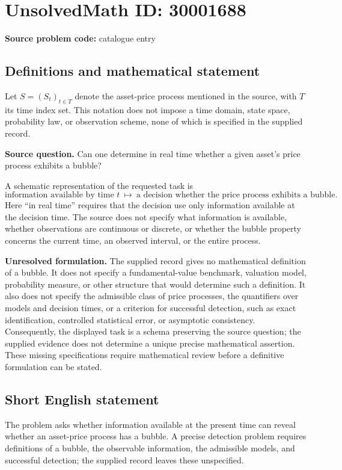\documentclass[11pt]{article}
\begin{document}
\section*{UnsolvedMath ID: 30001688}
\textbf{Source problem code:} catalogue entry
\subsection{Definitions and mathematical statement}
Let \(S=(S_t)_{t\in T}\) denote the asset-price process mentioned in the source, with \(T\) its time index set. This notation does not impose a time domain, state space, probability law, or observation scheme, none of which is specified in the supplied record.

\textbf{Source question.} Can one determine in real time whether a given asset's price process exhibits a bubble?

A schematic representation of the requested task is
\[
\text{information available by time }t
\ \longmapsto\
\text{a decision whether the price process exhibits a bubble}.
\]
Here ``in real time'' requires that the decision use only information available at the decision time. The source does not specify what information is available, whether observations are continuous or discrete, or whether the bubble property concerns the current time, an observed interval, or the entire process.

\textbf{Unresolved formulation.} The supplied record gives no mathematical definition of a bubble. It does not specify a fundamental-value benchmark, valuation model, probability measure, or other structure that would determine such a definition. It also does not specify the admissible class of price processes, the quantifiers over models and decision times, or a criterion for successful detection, such as exact identification, controlled statistical error, or asymptotic consistency. Consequently, the displayed task is a schema preserving the source question; the supplied evidence does not determine a unique precise mathematical assertion. These missing specifications require mathematical review before a definitive formulation can be stated.
\subsection{Short English statement}
The problem asks whether information available at the present time can reveal whether an asset-price process has a bubble. A precise detection problem requires definitions of a bubble, the observable information, the admissible models, and successful detection; the supplied record leaves these unspecified.
\end{document}
